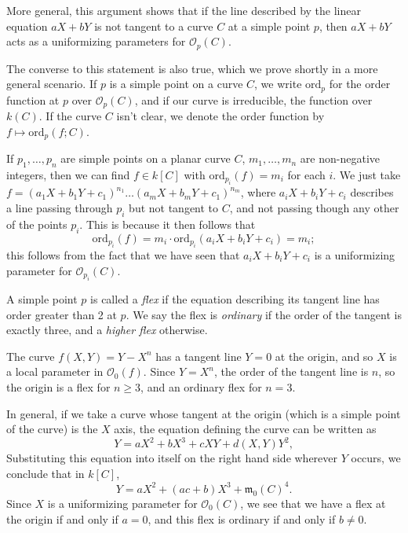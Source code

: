\begin{remark}
    More general, this argument shows that if the line described by the linear equation $aX + bY$ is not tangent to a curve $C$ at a simple point $p$, then $aX + bY$ acts as a uniformizing parameters for $\mathcal{O}_p(C)$.
\end{remark}

The converse to this statement is also true, which we prove shortly in a more general scenario. If $p$ is a simple point on a curve $C$, we write $\text{ord}_p$ for the order function at $p$ over $\mathcal{O}_p(C)$, and if our curve is irreducible, the function over $k(C)$. If the curve $C$ isn't clear, we denote the order function by $f \mapsto \text{ord}_p(f;C)$.

\begin{example}
    If $p_1, \dots, p_n$ are simple points on a planar curve $C$, $m_1,\dots,m_n$ are non-negative integers, then we can find $f \in k[C]$ with $\text{ord}_{p_i}(f) = m_i$ for each $i$. We just take $f = (a_1 X + b_1 Y + c_1)^{n_1} \dots (a_m X + b_m Y + c_1)^{n_m}$, where $a_i X + b_i Y + c_i$ describes a line passing through $p_i$ but not tangent to $C$, and not passing though any other of the points $p_i$. This is because it then follows that
    \[ \text{ord}_{p_i}(f) = m_i \cdot \text{ord}_{p_i}(a_i X + b_i Y + c_i) = m_i; \]
    this follows from the fact that we have seen that $a_i X + b_i Y + c_i$ is a uniformizing parameter for $\mathcal{O}_{p_i}(C)$.
\end{example}

A simple point $p$ is called a \emph{flex} if the equation describing its tangent line has order greater than 2 at $p$. We say the flex is \emph{ordinary} if the order of the tangent is exactly three, and a \emph{higher flex} otherwise.

\begin{example}
    The curve $f(X,Y) = Y - X^n$ has a tangent line $Y = 0$ at the origin, and so $X$ is a local parameter in $\mathcal{O}_0(f)$. Since $Y = X^n$, the order of the tangent line is $n$, so the origin is a flex for $n \geq 3$, and an ordinary flex for $n = 3$.
\end{example}

\begin{example}
    In general, if we take a curve whose tangent at the origin (which is a simple point of the curve) is the $X$ axis, the equation defining the curve can be written as
    \[ Y = aX^2 + bX^3 + cXY + d(X,Y) Y^2, \]
    Substituting this equation into itself on the right hand side wherever $Y$ occurs, we conclude that in $k[C]$,
    \[ Y = aX^2 + (ac + b)X^3 + \mathfrak{m}_0(C)^4. \]
    Since $X$ is a uniformizing parameter for $\mathcal{O}_0(C)$, we see that we have a flex at the origin if and only if $a = 0$, and this flex is ordinary if and only if $b \neq 0$.
\end{example}

